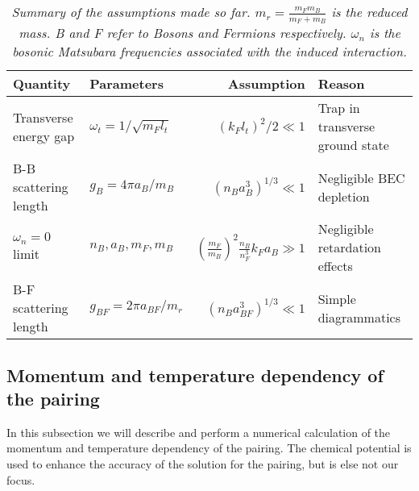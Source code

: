 \begin{table}[htb]
\centering
\caption{\textit{Summary of the assumptions made so far. $m_r = \frac{m_Fm_B}{m_F+m_B}$ is the reduced mass. B and F refer to Bosons and Fermions respectively. $\omega_n$ is the bosonic Matsubara frequencies associated with the induced interaction.}}
\begin{tabular}{|l|l|r|l|}
\hline \textbf{Quantity} & \textbf{Parameters} 				& \textbf{Assumption}						& \textbf{Reason}	\\
\hline Transverse energy gap & $\omega_t = 1/\sqrt{m_Fl_t}$ & $(k_Fl_t)^2/2 	\ll 1$ 					& Trap in transverse ground state \\
\hline B-B scattering length & $g_B = 4\pi a_B/m_B$			& $(n_Ba_B^3)^{1/3}	\ll 1$					& Negligible BEC depletion  \\
\hline $\omega_n = 0$ limit  & $n_B, a_B, m_F, m_B$			& $(\frac{m_F}{m_B})^2 \frac{n_B}{n_F^3}k_Fa_B \gg 1$ & Negligible retardation effects  \\
\hline B-F scattering length & $g_{BF} = 2\pi a_{BF}/m_r$ 	& $(n_Ba_{BF}^3)^{1/3}	\ll 1$				& Simple diagrammatics\\
\hline 
\end{tabular}
\label{tab.assumptions}
\end{table}

\subsection{Momentum and temperature dependency of the pairing}
In this subsection we will describe and perform a numerical calculation of the momentum and temperature dependency of the pairing. The chemical potential is used to enhance the accuracy of the solution for the pairing, but is else not our focus. 

